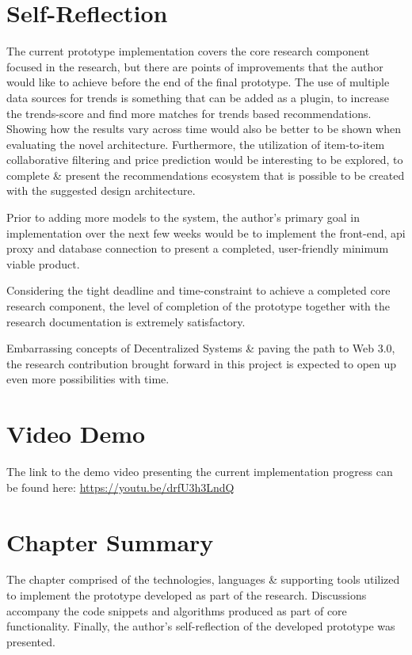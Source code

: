 \section{Self-Reflection}
The current prototype implementation covers the core research component focused in the research, but there are points of improvements that the author would like to achieve before the end of the final prototype. The use of multiple data sources for trends is something that can be added as a plugin, to increase the trends-score and find more matches for trends based recommendations. Showing how the results vary across time would also be better to be shown when evaluating the novel architecture. Furthermore, the utilization of item-to-item collaborative filtering and price prediction would be interesting to be explored, to complete \& present the recommendations ecosystem that is possible to be created with the suggested design architecture.

Prior to adding more models to the system, the author's primary goal in implementation over the next few weeks would be to implement the front-end, \gls{api} proxy and database connection to present a completed, user-friendly minimum viable product.

Considering the tight deadline and time-constraint to achieve a completed core research component, the level of completion of the prototype together with the research documentation is extremely satisfactory.

Embarrassing concepts of Decentralized Systems \& paving the path to Web 3.0, the research contribution brought forward in this project is expected to open up even more possibilities with time.

\section{Video Demo}
The link to the demo video presenting the current implementation progress can be found here: \url{https://youtu.be/drfU3h3LndQ}

\section{Chapter Summary}
The chapter comprised of the technologies, languages \& supporting tools utilized to implement the prototype developed as part of the research. Discussions accompany the code snippets and algorithms produced as part of core functionality. Finally, the author's self-reflection of the developed prototype was presented.
